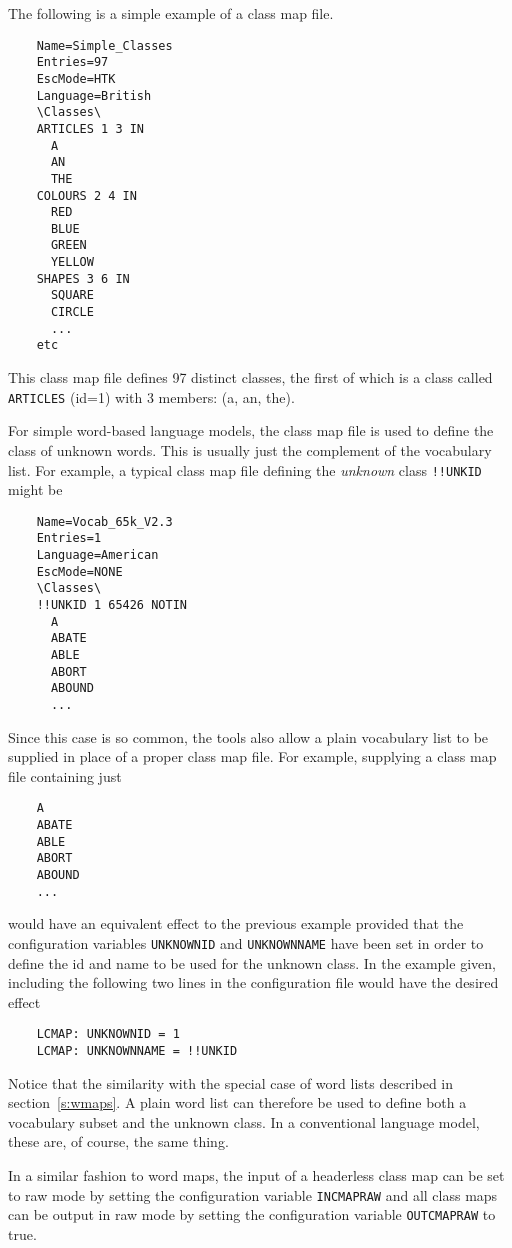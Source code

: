 The following is a simple example  of a class map file.
\begin{verbatim}
    Name=Simple_Classes
    Entries=97
    EscMode=HTK
    Language=British
    \Classes\
    ARTICLES 1 3 IN
      A
      AN
      THE
    COLOURS 2 4 IN
      RED
      BLUE
      GREEN
      YELLOW
    SHAPES 3 6 IN
      SQUARE
      CIRCLE
      ...
    etc
\end{verbatim}
This class map file defines 97 distinct classes, the first of which is
a class called \texttt{ARTICLES} (id=1) with 3 members: (a, an, the).

For simple word-based language models, the class map file is used to
define the class of unknown words.  This is usually just the
complement of the vocabulary list.  For example, a typical class map
file defining the \textit{unknown} class \texttt{!!UNKID} might
be 
\begin{verbatim}
    Name=Vocab_65k_V2.3
    Entries=1
    Language=American
    EscMode=NONE
    \Classes\
    !!UNKID 1 65426 NOTIN
      A
      ABATE
      ABLE
      ABORT
      ABOUND
      ...
\end{verbatim}
Since this case is so common, the tools also allow a plain
vocabulary list to be supplied in place of a proper class map file.
For example, supplying a class map file containing just
\begin{verbatim}
    A
    ABATE
    ABLE
    ABORT
    ABOUND
    ...
\end{verbatim}
would have an equivalent effect to the previous example provided that
the  configuration variables \texttt{UNKNOWNID} and
\texttt{UNKNOWNNAME} have been set in order to define the id and name
to be used for the unknown class.  In the example given, including the
following two lines in the configuration file would have the desired
effect
\begin{verbatim}
    LCMAP: UNKNOWNID = 1
    LCMAP: UNKNOWNNAME = !!UNKID
\end{verbatim}
Notice that the similarity with the special case of word lists
described in section~\ref{s:wmaps}.  A plain word list can therefore
be used to define both a vocabulary subset and the unknown class.  In
a conventional language model, these are, of course, the same thing.

In a similar fashion to word maps, the input of a headerless class map
can be set to raw mode by setting the  configuration
variable \texttt{INCMAPRAW} and all class maps can be output in raw
mode \index{class map!as vocabulary list} by setting the configuration
variable
\texttt{OUTCMAPRAW} to true.\index{vocabulary list}

